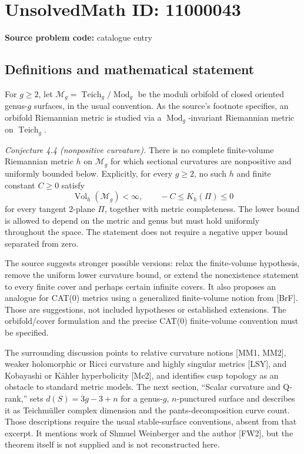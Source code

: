\documentclass[11pt]{article}
\begin{document}
\section*{UnsolvedMath ID: 11000043}
\textbf{Source problem code:} catalogue entry
\subsection{Definitions and mathematical statement}
For \(g\geq2\), let \(\mathcal M_g=\operatorname{Teich}_g/\operatorname{Mod}_g\) be the moduli orbifold of closed oriented genus-\(g\) surfaces, in the usual convention. As the source's footnote specifies, an orbifold Riemannian metric is studied via a \(\operatorname{Mod}_g\)-invariant Riemannian metric on \(\operatorname{Teich}_g\).

\emph{Conjecture 4.4 (nonpositive curvature).} There is no complete finite-volume Riemannian metric \(h\) on \(\mathcal M_g\) for which sectional curvatures are nonpositive and uniformly bounded below. Explicitly, for every \(g\geq2\), no such \(h\) and finite constant \(C\geq0\) satisfy
\[
 \operatorname{Vol}_h(\mathcal M_g)<\infty,
 \qquad -C\leq K_h(\Pi)\leq0
\]
for every tangent \(2\)-plane \(\Pi\), together with metric completeness. The lower bound is allowed to depend on the metric and genus but must hold uniformly throughout the space. The statement does not require a negative upper bound separated from zero.

The source suggests stronger possible versions: relax the finite-volume hypothesis, remove the uniform lower curvature bound, or extend the nonexistence statement to every finite cover and perhaps certain infinite covers. It also proposes an analogue for CAT(0) metrics using a generalized finite-volume notion from [BrF]. Those are suggestions, not included hypotheses or established extensions. The orbifold/cover formulation and the precise CAT(0) finite-volume convention must be specified.

The surrounding discussion points to relative curvature notions [MM1, MM2], weaker holomorphic or Ricci curvature and highly singular metrics [LSY], and Kobayashi or K\"ahler hyperbolicity [Mc2], and identifies cusp topology as an obstacle to standard metric models. The next section, ``Scalar curvature and Q-rank,'' sets \(d(S)=3g-3+n\) for a genus-\(g\), \(n\)-punctured surface and describes it as Teichm\"uller complex dimension and the pants-decomposition curve count. Those descriptions require the usual stable-surface conventions, absent from that excerpt. It mentions work of Shmuel Weinberger and the author [FW2], but the theorem itself is not supplied and is not reconstructed here.
\end{document}
